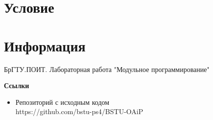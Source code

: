 \documentclass[12pt, a4paper]{article}
\begin{document}
\maketitle
\setcounter{page}{2}

\renewcommand{\contentsname}{Содержание}
\tableofcontents
\newpage

\labheading


\labreport

\section{Условие}
%

\section{Информация}



\newpage
\begin{thebibliography}{3}
    \bibitem{}
    БрГТУ.ПОИТ. Лабораторная работа "Модульное программирование"
\end{thebibliography}

\textbf{Ссылки}
\begin{itemize}
    \item Репозиторий с исходным кодом\\
    https://github.com/bstu-ps4/BSTU-OAiP
\end{itemize}
\end{document}
